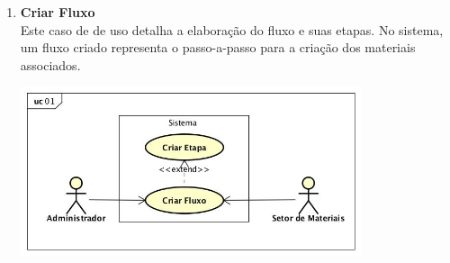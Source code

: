 \begin{enumerate}[label=\textbf{U02}, leftmargin=2cm]
	\item \textbf{Criar Fluxo} \\
	Este caso de de uso detalha a elaboração do fluxo e suas etapas. No sistema, um fluxo criado representa o passo-a-passo para a criação dos materiais associados. \\
	\begin{minipage}[c]{10cm}
	    \includegraphics[width=10cm]{Imagens/UC_CriarFluxo.jpg}
		\label{fig:uc_criar_fluxo}
	\end{minipage} \\


\end{enumerate}
